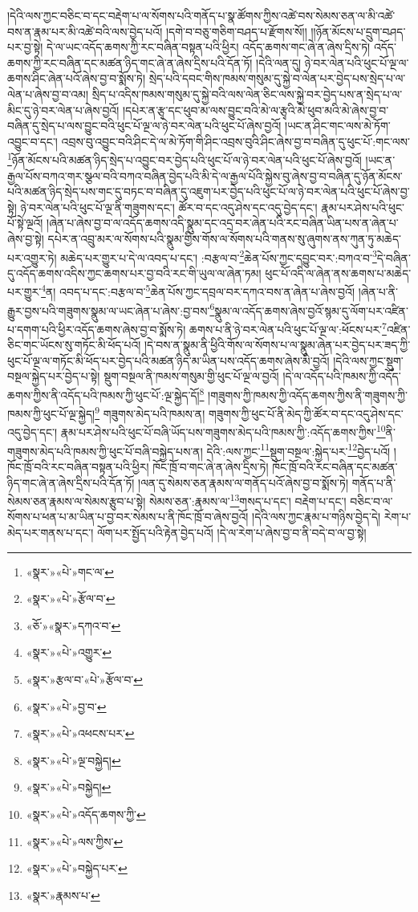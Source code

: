 །དེའི་ལས་ཀྱང་བཅིང་བ་དང་བརྡེག་པ་ལ་སོགས་པའི་གནོད་པ་སྣ་ཚོགས་ཀྱིས་འཚེ་བས་སེམས་ཅན་ལ་མི་འཚེ་བས་ན་རྣམ་པར་མི་འཚེ་བའི་ལས་བྱེད་པའོ། །དགེ་བ་བཅུ་གཅིག་བཤད་པ་རྫོགས་སོ།། །།ཉོན་མོངས་པ་དྲུག་བཤད་པར་བྱ་སྟེ། དེ་ལ་ཡང་འདོད་ཆགས་ཀྱི་རང་བཞིན་བསྟན་པའི་ཕྱིར། འདོད་ཆགས་གང་ཞེ་ན་ཞེས་དྲིས་ཏེ། འདོད་ཆགས་ཀྱི་རང་བཞིན་དང་མཚན་ཉིད་གང་ཞེ་ན་ཞེས་དྲིས་པའི་དོན་ཏོ། །དེའི་ལན་དུ། ཉེ་བར་ལེན་པའི་ཕུང་པོ་ལྔ་ལ་ཆགས་ཤིང་ཞེན་པའོ་ཞེས་བྱ་བ་སྨོས་ཏེ། སྲེད་པའི་དབང་གིས་ཁམས་གསུམ་དུ་སྐྱེ་བ་ལེན་པར་བྱེད་པས་སྲེད་པ་ལ་ལེན་པ་ཞེས་བྱ་བ་འམ། སྲིད་པ་འདིས་ཁམས་གསུམ་དུ་སྐྱེ་བའི་ལས་ལེན་ཅིང་ལས་སྐྱེ་བར་བྱེད་པས་ན་སྲེད་པ་ལ་མིང་དུ་ཉེ་བར་ལེན་པ་ཞེས་བྱའོ། །དཔེར་ན་རྩྭ་དང་ཕུབ་མ་ལས་བྱུང་བའི་མེ་ལ་རྩྭའི་མེ་ཕུབ་མའི་མེ་ཞེས་བྱ་བ་བཞིན་དུ་སྲེད་པ་ལས་བྱུང་བའི་ཕུང་པོ་ལྔ་ལ་ཉེ་བར་ལེན་པའི་ཕུང་པོ་ཞེས་བྱའོ། །ཡང་ན་ཤིང་གང་ལས་མེ་ཏོག་འབྱུང་བ་དང་། འབྲས་བུ་འབྱུང་བའི་ཤིང་དེ་ལ་མེ་ཏོག་གི་ཤིང་འབྲས་བུའི་ཤིང་ཞེས་བྱ་བ་བཞིན་དུ་ཕུང་པོ་:གང་ལས་\footnote{«སྣར་»«པེ་»གང་ལ་}ཉོན་མོངས་པའི་མཚན་ཉིད་སྲེད་པ་འབྱུང་བར་བྱེད་པའི་ཕུང་པོ་ལ་ཉེ་བར་ལེན་པའི་ཕུང་པོ་ཞེས་བྱའོ། །ཡང་ན་རྒྱལ་པོས་བཀའ་གར་སྩལ་བའི་བཀའ་བཞིན་བྱེད་པའི་མི་དེ་ལ་རྒྱལ་པོའི་སྐྱེས་བུ་ཞེས་བྱ་བ་བཞིན་དུ་ཉོན་མོངས་པའི་མཚན་ཉིད་སྲེད་པས་གང་དུ་བཏང་བ་བཞིན་དུ་འཇུག་པར་བྱེད་པའི་ཕུང་པོ་ལ་ཉེ་བར་ལེན་པའི་ཕུང་པོ་ཞེས་བྱ་སྟེ། ཉེ་བར་ལེན་པའི་ཕུང་པོ་ལྔ་ནི་གཟུགས་དང་། ཚོར་བ་དང་འདུ་ཤེས་དང་འདུ་བྱེད་དང་། རྣམ་པར་ཤེས་པའི་ཕུང་པོ་སྟེ་ལྔའོ། །ཞེན་པ་ཞེས་བྱ་བ་ལ་འདོད་ཆགས་འདི་སྣུམ་དང་འདྲ་བར་ཞེན་པའི་རང་བཞིན་ཡིན་པས་ན་ཞེན་པ་ཞེས་བྱ་སྟེ། དཔེར་ན་འབྲུ་མར་ལ་སོགས་པའི་སྣུམ་གྱིས་གོས་ལ་སོགས་པའི་གནས་སུ་ཞུགས་ནས་ཀུན་ཏུ་མཆེད་པར་འགྱུར་ཏེ། མཆེད་པར་གྱུར་པ་དེ་ལ་འབད་པ་དང་། :བརྩལ་བ་\footnote{«སྣར་»«པེ་»རྩོལ་བ་}ཆེན་པོས་ཀྱང་དབྱུང་བར་:བཀའ་བ་\footnote{«ཅོ་»«སྣར་»དཀའ་བ་}དེ་བཞིན་དུ་འདོད་ཆགས་འདིས་ཀྱང་ཆགས་པར་བྱ་བའི་རང་གི་ཡུལ་ལ་ཞེན་ཏམ། ཕུང་པོ་འདི་ལ་ཞེན་ནས་ཆགས་པ་མཆེད་པར་གྱུར་\footnote{«སྣར་»«པེ་»འགྱུར་}ན། འབད་པ་དང་:བརྩལ་བ་\footnote{«སྣར་»རྩལ་བ་«པེ་»རྩོལ་བ་}ཆེན་པོས་ཀྱང་དབྲལ་བར་དཀའ་བས་ན་ཞེན་པ་ཞེས་བྱའོ། །ཞེན་པ་ནི་རྒྱུར་བྱས་པའི་གཟུགས་སྣུམ་ལ་ཡང་ཞེན་པ་ཞེས་:བྱ་བས་\footnote{«སྣར་»«པེ་»བྱ་བ་}སྣུམ་ལ་འདོད་ཆགས་ཞེས་བྱའོ་སྙམ་དུ་ལོག་པར་འཛིན་པ་དགག་པའི་ཕྱིར་འདོད་ཆགས་ཞེས་བྱ་བ་སྨོས་ཏེ། ཆགས་པ་ནི་ཉེ་བར་ལེན་པའི་ཕུང་པོ་ལྔ་ལ་:ཕོངས་པར་\footnote{«སྣར་»«པེ་»འཕངས་པར་}འཛིན་ཅིང་གང་ཡོངས་སུ་གཏོང་མི་ཕོད་པའོ། །དེ་བས་ན་སྣུམ་ནི་ཕྱིའི་གོས་ལ་སོགས་པ་ལ་སྣུམ་ཞེན་པར་བྱེད་པར་ཟད་ཀྱི་ཕུང་པོ་ལྔ་ལ་གཏོང་མི་ཕོད་པར་བྱེད་པའི་མཚན་ཉིད་མ་ཡིན་པས་འདོད་ཆགས་ཞེས་མི་བྱའོ། །དེའི་ལས་ཀྱང་སྡུག་བསྔལ་སྐྱེད་པར་བྱེད་པ་སྟེ། སྡུག་བསྔལ་ནི་ཁམས་གསུམ་གྱི་ཕུང་པོ་ལྔ་ལ་བྱའོ། །དེ་ལ་འདོད་པའི་ཁམས་ཀྱི་འདོད་ཆགས་ཀྱིས་ནི་འདོད་པའི་ཁམས་ཀྱི་ཕུང་པོ་:ལྔ་སྐྱེད་དོ།\footnote{«སྣར་»«པེ་»ལྔ་བསྐྱེད།} །གཟུགས་ཀྱི་ཁམས་ཀྱི་འདོད་ཆགས་ཀྱིས་ནི་གཟུགས་ཀྱི་ཁམས་ཀྱི་ཕུང་པོ་ལྔ་སྐྱེད།\footnote{«སྣར་»«པེ་»བསྐྱེད།} གཟུགས་མེད་པའི་ཁམས་ན། གཟུགས་ཀྱི་ཕུང་པོ་ནི་མེད་ཀྱི་ཚོར་བ་དང་འདུ་ཤེས་དང་འདུ་བྱེད་དང་། རྣམ་པར་ཤེས་པའི་ཕུང་པོ་བཞི་ཡོད་པས་གཟུགས་མེད་པའི་ཁམས་ཀྱི་:འདོད་ཆགས་ཀྱིས་\footnote{«སྣར་»«པེ་»འདོད་ཆགས་ཀྱི་}ནི་གཟུགས་མེད་པའི་ཁམས་ཀྱི་ཕུང་པོ་བཞི་བསྐྱེད་པས་ན། དེའི་:ལས་ཀྱང་\footnote{«སྣར་»«པེ་»ལས་ཀྱིས་}སྡུག་བསྔལ་:སྐྱེད་པར་\footnote{«སྣར་»«པེ་»བསྐྱེད་པར་}བྱེད་པའོ། །ཁོང་ཁྲོ་བའི་རང་བཞིན་བསྟན་པའི་ཕྱིར། ཁོང་ཁྲོ་བ་གང་ཞེ་ན་ཞེས་དྲིས་ཏེ། ཁོང་ཁྲོ་བའི་རང་བཞིན་དང་མཚན་ཉིད་གང་ཞེ་ན་ཞེས་དྲིས་པའི་དོན་ཏོ། །ལན་དུ་སེམས་ཅན་རྣམས་ལ་གནོད་པའོ་ཞེས་བྱ་བ་སྨོས་ཏེ། གནོད་པ་ནི་སེམས་ཅན་རྣམས་ལ་སེམས་རྩུབ་པ་སྟེ། སེམས་ཅན་:རྣམས་ལ་\footnote{«སྣར་»རྣམས་པ་}གསད་པ་དང་། བརྡེག་པ་དང་། བཅིང་བ་ལ་སོགས་པ་ཕན་པ་མ་ཡིན་པ་བྱ་བར་སེམས་པ་ནི་ཁོང་ཁྲོ་བ་ཞེས་བྱའོ། །དེའི་ལས་ཀྱང་རྣམ་པ་གཉིས་བྱེད་དེ། རེག་པ་མེད་པར་གནས་པ་དང་། ལོག་པར་སྤྱོད་པའི་རྟེན་བྱེད་པའོ། །དེ་ལ་རེག་པ་ཞེས་བྱ་བ་ནི་བདེ་བ་ལ་བྱ་སྟེ། 
